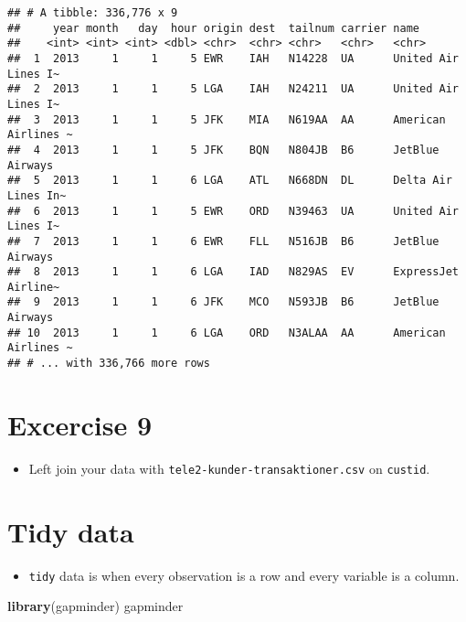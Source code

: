 \documentclass[]{book}
\newenvironment{Shaded}{\begin{snugshade}}{\end{snugshade}}
\newcommand{\KeywordTok}[1]{\textcolor[rgb]{0.13,0.29,0.53}{\textbf{#1}}}
\newcommand{\NormalTok}[1]{#1}
\providecommand{\tightlist}{%
  \setlength{\itemsep}{0pt}\setlength{\parskip}{0pt}}
\begin{document}
\begin{verbatim}
## # A tibble: 336,776 x 9
##     year month   day  hour origin dest  tailnum carrier name               
##    <int> <int> <int> <dbl> <chr>  <chr> <chr>   <chr>   <chr>              
##  1  2013     1     1     5 EWR    IAH   N14228  UA      United Air Lines I~
##  2  2013     1     1     5 LGA    IAH   N24211  UA      United Air Lines I~
##  3  2013     1     1     5 JFK    MIA   N619AA  AA      American Airlines ~
##  4  2013     1     1     5 JFK    BQN   N804JB  B6      JetBlue Airways    
##  5  2013     1     1     6 LGA    ATL   N668DN  DL      Delta Air Lines In~
##  6  2013     1     1     5 EWR    ORD   N39463  UA      United Air Lines I~
##  7  2013     1     1     6 EWR    FLL   N516JB  B6      JetBlue Airways    
##  8  2013     1     1     6 LGA    IAD   N829AS  EV      ExpressJet Airline~
##  9  2013     1     1     6 JFK    MCO   N593JB  B6      JetBlue Airways    
## 10  2013     1     1     6 LGA    ORD   N3ALAA  AA      American Airlines ~
## # ... with 336,766 more rows
\end{verbatim}

\hypertarget{excercise-9}{%
\section{Excercise 9}\label{excercise-9}}

\begin{itemize}
\tightlist
\item
  Left join your data with \texttt{tele2-kunder-transaktioner.csv} on \texttt{custid}.
\end{itemize}

\hypertarget{tidy-data}{%
\section{Tidy data}\label{tidy-data}}

\begin{itemize}
\tightlist
\item
  \texttt{tidy} data is when every observation is a row and every variable is a column.
\end{itemize}

\begin{Shaded}
\begin{Highlighting}[]
\KeywordTok{library}\NormalTok{(gapminder)}
\NormalTok{gapminder}
\end{Highlighting}
\end{Shaded}
\end{document}
